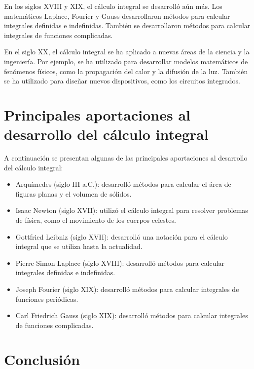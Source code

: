\documentclass[12pt]{article}
\begin{document}
En los siglos XVIII y XIX, el cálculo integral se desarrolló aún más. Los matemáticos Laplace, Fourier y Gauss desarrollaron métodos para calcular integrales definidas e indefinidas. También se desarrollaron métodos para calcular integrales de funciones complicadas. \newline

En el siglo XX, el cálculo integral se ha aplicado a nuevas áreas de la ciencia y la ingeniería. Por ejemplo, se ha utilizado para desarrollar modelos matemáticos de fenómenos físicos, como la propagación del calor y la difusión de la luz. También se ha utilizado para diseñar nuevos dispositivos, como los circuitos integrados. \newline


\newpage

\section*{Principales aportaciones al desarrollo del cálculo integral} \label{rehearsal-primary}

A continuación se presentan algunas de las principales aportaciones al desarrollo del cálculo integral: \newline

\begin{itemize}
  \item Arquímedes (siglo III a.C.): desarrolló métodos para calcular el área de figuras planas y el volumen de sólidos.
  \item Isaac Newton (siglo XVII): utilizó el cálculo integral para resolver problemas de física, como el movimiento de los cuerpos celestes.
  \item Gottfried Leibniz (siglo XVII): desarrolló una notación para el cálculo integral que se utiliza hasta la actualidad.
  \item Pierre-Simon Laplace (siglo XVIII): desarrolló métodos para calcular integrales definidas e indefinidas.
  \item Joseph Fourier (siglo XIX): desarrolló métodos para calcular integrales de funciones periódicas.
  \item Carl Friedrich Gauss (siglo XIX): desarrolló métodos para calcular integrales de funciones complicadas.
\end{itemize}
\section*{Conclusión} \label{rehearsal-end}
\end{document}
